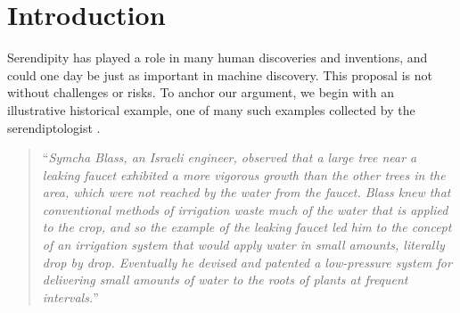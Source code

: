 \ifdraft{\tableofcontents
\clearpage
}{}

\section{Introduction} \label{sec:why-this-matters}


Serendipity has played a role in many human discoveries and inventions, and could one day be just as important in machine discovery.  This proposal is not without challenges or risks.
To anchor our argument, we begin with an illustrative historical example, one of many such examples collected by the serendiptologist \citet{van1994anatomy}.

\begin{quote}
``\emph{Symcha Blass, an Israeli engineer, observed that a large tree near a leaking faucet exhibited a more vigorous growth than the other trees in the area, which were not reached by the water from the faucet.  Blass knew that conventional methods of irrigation waste much of the water that is applied to the crop, and so the example of the leaking faucet led him to the concept of an irrigation system that would apply water in small amounts, literally drop by drop. Eventually he devised and patented a low-pressure system for delivering small amounts of water to the roots of plants at frequent intervals.}'' \cite{shoji1977drip} 
\end{quote}





